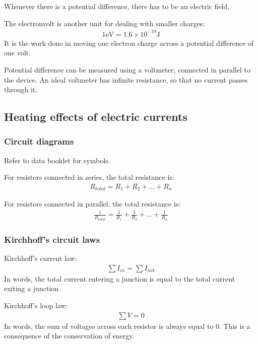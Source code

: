 Whenever there is a potential difference, there has to be an electric field.

The electronvolt is another unit for dealing with smaller charges:
\begin{align*}
    1 \text{eV} = 1.6 \times 10^{-19} \text{J}
\end{align*}
It is the work done in moving one electron charge across a potential difference
of one volt.

Potential difference can be measured using a voltmeter, connected in parallel
to the device. An ideal voltmeter has infinite resistance, so that no current
passes through it.

\subsection{Heating effects of electric currents}

\subsubsection{Circuit diagrams}
Refer to data booklet for symbols.

For resistors connected in series, the total resistance is:
\begin{align*}
    R_{total} = R_1 + R_2 + ... + R_n
\end{align*}

For resistors connected in parallel, the total resistance is:
\begin{align*}
    \frac{1}{R_{total}} = \frac{1}{R_1} + \frac{1}{R_2} + ... + \frac{1}{R_n}
\end{align*}

\subsubsection{Kirchhoff's circuit laws}
Kirchhoff's current law:
\begin{align*}
    \sum I_{in} = \sum I_{out}
\end{align*}
In words, the total current entering a junction is equal to the
total current exiting a junction.

Kirchhoff's loop law:
\begin{align*}
    \sum V = 0
\end{align*}
In words, the sum of voltages across each resistor is always equal to 0. This
is a consequence of the conservation of energy.

